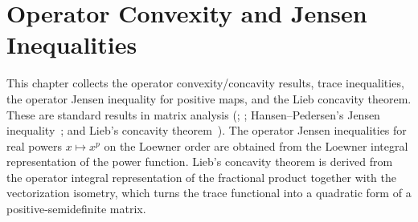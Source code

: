 \chapter{Operator Convexity and Jensen Inequalities}\label{ch:operator_convexity}

This chapter collects the operator convexity/concavity results, trace
inequalities, the operator Jensen inequality for positive maps, and the
Lieb concavity theorem. These are standard results in matrix analysis
(\cite[Chapter~V]{Bhatia1997Matrix}; \cite[Theorems~5.12 and~5.13]{Wolf2012Quantum};
Hansen--Pedersen's Jensen inequality~\cite{HansenPedersen1982Jensen};
and Lieb's concavity theorem~\cite{Lieb1973Convex}). The operator Jensen
inequalities for real powers $x\mapsto x^p$ on the Loewner order are obtained from
the Loewner integral representation of the power function. Lieb's concavity theorem
is derived from the operator integral representation of the fractional product
together with the vectorization isometry, which turns the trace functional into a
quadratic form of a positive-semidefinite matrix.

